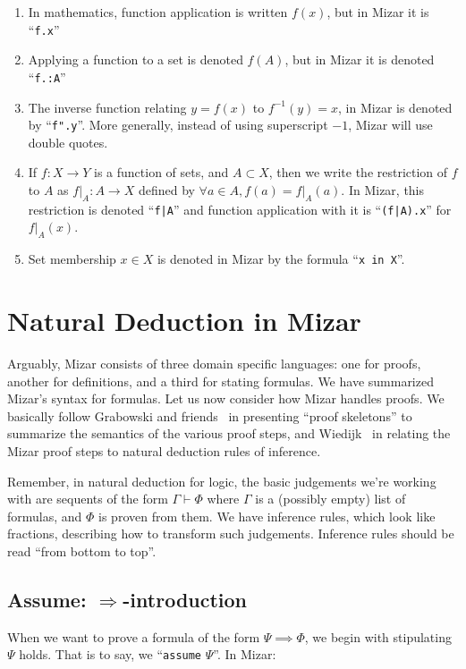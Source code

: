 \begin{enumerate}
\item{} In mathematics, function application is written $f(x)$, but in
  Mizar it is ``\texttt{f.x}''
\item{} Applying a function to a set is denoted $f(A)$, but in Mizar it is
  denoted ``\texttt{f.:A}''
\item{} The inverse function relating $y=f(x)$ to $f^{-1}(y)=x$, in Mizar
  is denoted by ``\texttt{f".y}''. More generally, instead of using
  superscript $-1$, Mizar will use double quotes.
\item{} If $f\colon X\to Y$ is a function of sets, and $A\subset X$, then
  we write the restriction of $f$ to $A$ as $f|_{A}\colon A\to X$
  defined by $\forall a\in A, f(a)=f|_{A}(a)$. In Mizar, this
  restriction is denoted ``\verb#f|A#'' and function application with it
  is ``\verb#(f|A).x#'' for $f|_{A}(x)$.
\item{} Set membership $x\in X$ is
  denoted in Mizar by the formula ``\verb#x in X#''.
\end{enumerate}

\section{Natural Deduction in Mizar}

Arguably, Mizar consists of three domain specific languages: one for
proofs, another for definitions, and a third for stating formulas. We
have summarized Mizar's syntax for formulas. Let us now consider how
Mizar handles proofs. We basically follow Grabowski and
friends~\cite{grabowski2010mizar} in presenting ``proof skeletons'' to
summarize the semantics of the various proof steps, and
Wiedijk~\cite{wiedijk2000mv} in relating the Mizar proof steps to
natural deduction rules of inference.

Remember, in natural deduction for logic, the basic judgements we're
working with are sequents of the form $\Gamma\vdash\Phi$ where $\Gamma$
is a (possibly empty) list of formulas, and $\Phi$ is proven from
them. We have inference rules, which look like fractions, describing how
to transform such judgements. Inference rules should be read ``from
bottom to top''.

\subsection{Assume: $\Longrightarrow$-introduction}
When we want to prove a formula of the form $\Psi\implies\Phi$, we begin
with stipulating $\Psi$ holds. That is to say, we ``\verb#assume# $\Psi$''.
In Mizar:

